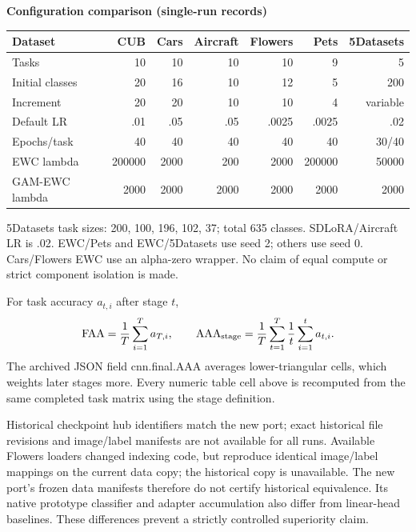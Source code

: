 \documentclass[10pt]{article}
\begin{document}

\clearpage
\noindent\textbf{Configuration comparison (single-run records)}\par\medskip
\small
\noindent\begin{tabular*}{\linewidth}{@{\extracolsep{\fill}}lrrrrrr@{}}
\toprule
Dataset & CUB & Cars & Aircraft & Flowers & Pets & 5Datasets\\
\midrule
Tasks & 10 & 10 & 10 & 10 & 9 & 5\\
Initial classes & 20 & 16 & 10 & 12 & 5 & 200\\
Increment & 20 & 20 & 10 & 10 & 4 & variable\\
Default LR & .01 & .05 & .05 & .0025 & .0025 & .02\\
Epochs/task & 40 & 40 & 40 & 40 & 40 & 30/40\\
EWC lambda & 200000 & 2000 & 200 & 2000 & 200000 & 50000\\
GAM-EWC lambda & 2000 & 2000 & 2000 & 2000 & 2000 & 2000\\
\bottomrule
\end{tabular*}
\par\medskip
5Datasets task sizes: 200, 100, 196, 102, 37; total 635 classes.
SDLoRA/Aircraft LR is .02. EWC/Pets and EWC/5Datasets use seed 2; others use seed 0.
Cars/Flowers EWC use an alpha-zero wrapper. No claim of equal compute or strict component isolation is made.
\par\medskip
For task accuracy $a_{t,i}$ after stage $t$,
\[\mathrm{FAA}=\frac1T\sum_{i=1}^{T}a_{T,i},\qquad
\mathrm{AAA}_{\rm stage}=\frac1T\sum_{t=1}^{T}\frac1t\sum_{i=1}^{t}a_{t,i}.\]
The archived JSON field \textnormal{cnn.final.AAA} averages lower-triangular cells, which weights later stages more. Every numeric table cell above is recomputed from the same completed task matrix using the stage definition.
\par\medskip
Historical checkpoint hub identifiers match the new port; exact historical file revisions and image/label manifests are not available for all runs. Available Flowers loaders changed indexing code, but reproduce identical image/label mappings on the current data copy; the historical copy is unavailable. The new port's frozen data manifests therefore do not certify historical equivalence. Its native prototype classifier and adapter accumulation also differ from linear-head baselines. These differences prevent a strictly controlled superiority claim.
\end{document}
